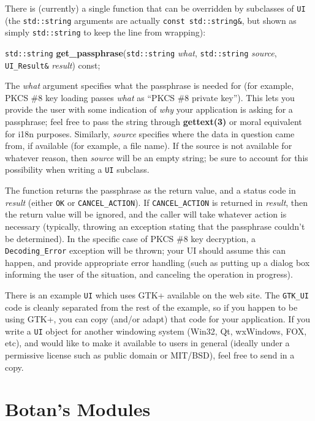 \documentclass{article}
\newcommand{\function}[1]{\textbf{#1}}
\newcommand{\type}[1]{\texttt{#1}}
\renewcommand{\arg}[1]{\textsl{#1}}
\begin{document}
There is (currently) a single function that can be overridden by subclasses of
\type{UI} (the \type{std::string} arguments are actually \type{const
std::string\&}, but shown as simply \type{std::string} to keep the line from
wrapping):

\noindent
\type{std::string} \function{get\_passphrase}(\type{std::string} \arg{what},
                                              \type{std::string} \arg{source},
                                     \type{UI\_Result\&} \arg{result}) const;

The \arg{what} argument specifies what the passphrase is needed for (for
example, PKCS \#8 key loading passes \arg{what} as ``PKCS \#8 private
key''). This lets you provide the user with some indication of \emph{why} your
application is asking for a passphrase; feel free to pass the string through
\function{gettext(3)} or moral equivalent for i18n purposes. Similarly,
\arg{source} specifies where the data in question came from, if available (for
example, a file name). If the source is not available for whatever reason, then
\arg{source} will be an empty string; be sure to account for this possibility
when writing a \type{UI} subclass.

The function returns the passphrase as the return value, and a status code in
\arg{result} (either \type{OK} or \type{CANCEL\_ACTION}). If
\type{CANCEL\_ACTION} is returned in \arg{result}, then the return value will
be ignored, and the caller will take whatever action is necessary (typically,
throwing an exception stating that the passphrase couldn't be determined). In
the specific case of PKCS \#8 key decryption, a \type{Decoding\_Error}
exception will be thrown; your UI should assume this can happen, and provide
appropriate error handling (such as putting up a dialog box informing the user
of the situation, and canceling the operation in progress).

There is an example \type{UI} which uses GTK+ available on the web site. The
\type{GTK\_UI} code is cleanly separated from the rest of the example, so if
you happen to be using GTK+, you can copy (and/or adapt) that code for your
application. If you write a \type{UI} object for another windowing system
(Win32, Qt, wxWindows, FOX, etc), and would like to make it available to users
in general (ideally under a permissive license such as public domain or
MIT/BSD), feel free to send in a copy.

\pagebreak
\section{Botan's Modules}
\end{document}
